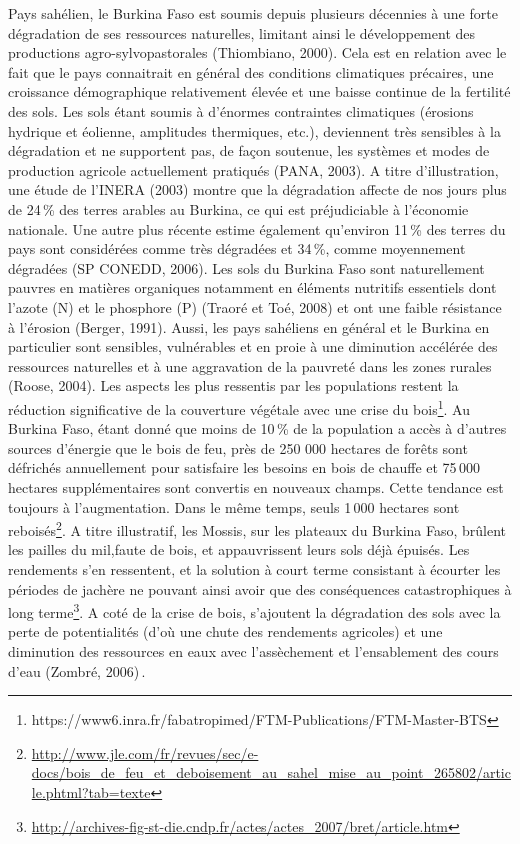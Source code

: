 \documentclass[a4paper,11pt]{article}
\begin{document}
Pays sahélien, le Burkina Faso est soumis depuis plusieurs décennies à
une forte dégradation de ses ressources naturelles, limitant ainsi le
développement des productions agro-sylvopastorales (Thiombiano,
2000). Cela est en relation avec le fait que le pays connaitrait en
général des conditions climatiques précaires, une croissance
démographique relativement élevée et une baisse continue de la
fertilité des sols. Les sols étant soumis à d’énormes contraintes
climatiques (érosions hydrique et éolienne, amplitudes thermiques,
etc.), deviennent très sensibles à la dégradation et ne supportent
pas, de façon soutenue, les systèmes et modes de production agricole
actuellement pratiqués (PANA, 2003). A titre d’illustration, une étude
de l’INERA (2003) montre que la dégradation affecte de nos jours plus
de 24\,\% des terres arables au Burkina, ce qui est préjudiciable à
l’économie nationale. Une autre plus récente estime également
qu’environ 11\,\% des terres du pays sont considérées comme très
dégradées et 34\,\%, comme moyennement dégradées (SP CONEDD, 2006).
Les sols du Burkina Faso sont naturellement pauvres en matières
organiques notamment en éléments nutritifs essentiels dont l’azote (N)
et le phosphore (P) (Traoré et Toé, 2008) et ont une faible résistance
à l’érosion (Berger, 1991). Aussi, les pays sahéliens en général et le
Burkina en particulier sont sensibles, vulnérables et en proie à une
diminution accélérée des ressources naturelles et à une aggravation de
la pauvreté dans les zones rurales (Roose, 2004). Les aspects les plus
ressentis par les populations restent la réduction significative de la
couverture végétale avec une crise du
bois\footnote{https://www6.inra.fr/fabatropimed/FTM-Publications/FTM-Master-BTS}.
Au Burkina Faso, étant donné que moins de 10\,\% de la population a accès
à d’autres sources d’énergie que le bois de feu, près de 250 000
hectares de forêts sont défrichés annuellement pour satisfaire les
besoins en bois de chauffe et 75\,000 hectares supplémentaires sont
convertis en nouveaux champs. Cette tendance est toujours à
l’augmentation. Dans le même temps, seuls 1\,000 hectares sont
reboisés\footnote{\url{http://www.jle.com/fr/revues/sec/e-docs/bois_de_feu_et_deboisement_au_sahel_mise_au_point_265802/article.phtml?tab=texte}}. A
titre illustratif, les Mossis, sur les plateaux du Burkina Faso,
brûlent les pailles du mil,faute de bois, et appauvrissent leurs sols
déjà épuisés. Les rendements s’en ressentent, et la solution à court
terme consistant à écourter les périodes de jachère ne pouvant ainsi
avoir que des conséquences catastrophiques à long
terme\footnote{\url{http://archives-fig-st-die.cndp.fr/actes/actes_2007/bret/article.htm}}.
A coté de la crise de bois, s’ajoutent la dégradation des sols avec la
perte de potentialités (d’où une chute des rendements agricoles) et
une diminution des ressources en eaux avec l’assèchement et
l’ensablement des cours d’eau (Zombré, 2006)\,\cite{Doggett_1988}.
\end{document}
